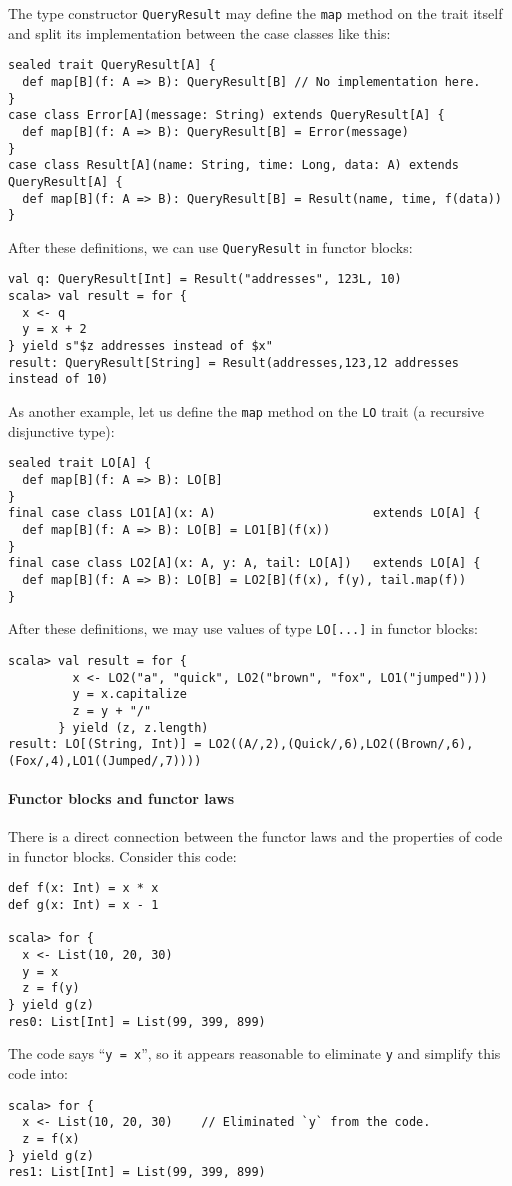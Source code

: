 The type constructor \lstinline!QueryResult! may define the \lstinline!map!
method on the trait itself and split its implementation between the
case classes like this:
\begin{lstlisting}
sealed trait QueryResult[A] {
  def map[B](f: A => B): QueryResult[B] // No implementation here.
}
case class Error[A](message: String) extends QueryResult[A] {
  def map[B](f: A => B): QueryResult[B] = Error(message)
}
case class Result[A](name: String, time: Long, data: A) extends QueryResult[A] {
  def map[B](f: A => B): QueryResult[B] = Result(name, time, f(data))
}
\end{lstlisting}
After these definitions, we can use \lstinline!QueryResult! in functor
blocks:
\begin{lstlisting}
val q: QueryResult[Int] = Result("addresses", 123L, 10)
scala> val result = for {
  x <- q
  y = x + 2
} yield s"$z addresses instead of $x"
result: QueryResult[String] = Result(addresses,123,12 addresses instead of 10)
\end{lstlisting}

As another example, let us define the \lstinline!map! method on the
\lstinline!LO! trait (a recursive disjunctive type):
\begin{lstlisting}
sealed trait LO[A] {
  def map[B](f: A => B): LO[B]
}
final case class LO1[A](x: A)                      extends LO[A] {
  def map[B](f: A => B): LO[B] = LO1[B](f(x))
}
final case class LO2[A](x: A, y: A, tail: LO[A])   extends LO[A] {
  def map[B](f: A => B): LO[B] = LO2[B](f(x), f(y), tail.map(f))
}
\end{lstlisting}
After these definitions, we may use values of type \lstinline!LO[...]!
in functor blocks:
\begin{lstlisting}
scala> val result = for {
         x <- LO2("a", "quick", LO2("brown", "fox", LO1("jumped")))
         y = x.capitalize
         z = y + "/"
       } yield (z, z.length)
result: LO[(String, Int)] = LO2((A/,2),(Quick/,6),LO2((Brown/,6),(Fox/,4),LO1((Jumped/,7))))
\end{lstlisting}


\paragraph{Functor blocks and functor laws}

There is a direct connection between the functor laws and the properties
of code in functor blocks. Consider this code:
\begin{lstlisting}
def f(x: Int) = x * x
def g(x: Int) = x - 1

scala> for {
  x <- List(10, 20, 30)
  y = x
  z = f(y)
} yield g(z)
res0: List[Int] = List(99, 399, 899)
\end{lstlisting}
The code says \textsf{``}\lstinline!y = x!\textsf{''}, so it appears reasonable to
eliminate \lstinline!y! and simplify this code into:
\begin{lstlisting}
scala> for {
  x <- List(10, 20, 30)    // Eliminated `y` from the code.
  z = f(x)
} yield g(z)
res1: List[Int] = List(99, 399, 899)
\end{lstlisting}


